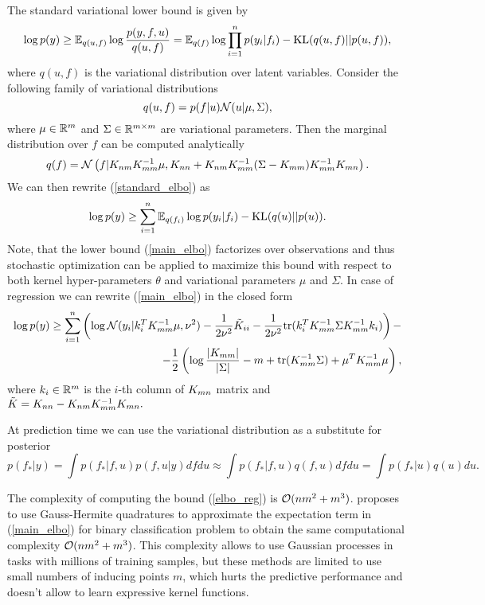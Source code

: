   The standard variational lower bound is given by
  \begin{equation}
  \label{standard_elbo}
    \log p(y) \ge \mathbb{E}_{q(u, f)} \log \frac {p(y, f, u)} {q(u, f)} =
    \mathbb{E}_{q(f)} \log \prod_{i=1}^n p(y_i | f_i) - \mbox{KL}(q(u, f) || p(u, f)),
  \end{equation}
  where $q(u, f)$ is the variational distribution over latent variables.
  Consider the following family of variational distributions
  \begin{equation}
  \label{var_family}
    q(u, f) = p(f | u) \mathcal{N}(u | \mu, \Sigma),
  \end{equation}
  where $\mu \in \mathbb{R}^m$ and $\Sigma \in \mathbb{R}^{m \times m}$ are variational
  parameters. Then the marginal distribution over $f$ can be computed analytically
  \[
    q(f) = \mathcal{N}\left(f | K_{nm} K_{mm}^{-1} \mu, K_{nn} + K_{nm} K_{mm}^{-1} (\Sigma - K_{mm}) K_{mm}^{-1} K_{mn}\right).
  \]
  We can then rewrite (\ref{standard_elbo}) as
\begin{equation}
\label{main_elbo}
  \log p(y) \ge \sum_{i=1}^n \mathbb{E}_{q(f_i)} \log p(y_i | f_i) - \mbox{KL}(q(u) || p(u)).
\end{equation}
  Note, that the lower bound (\ref{main_elbo}) factorizes over observations and
  thus stochastic optimization can be applied to maximize this bound with respect
  to both kernel hyper-parameters $\theta$ and variational parameters $\mu$ and
  $\Sigma$. In case of regression we can rewrite (\ref{main_elbo}) in the closed
  form
  \begin{equation}
    \label{elbo_reg}
    \begin{split}
      \log p(y) \ge
      \sum_{i=1}^n \left ( \log \mathcal{N} (y_i | k_{i}^T K_{mm}^{-1} \mu, \nu^2) -
        \frac 1 {2\nu^2} \tilde K_{ii} -
        \frac 1 {2\nu^2} \mbox{tr} (k_{i}^T K_{mm}^{-1} \Sigma K_{mm}^{-1} k_{i})
      \right )-
      \\
      - \frac 1 2 \left(
        \log \frac {|K_{mm}|} {|\Sigma|} - m + \mbox{tr}(K_{mm}^{-1} \Sigma) +
        \mu^T K_{mm}^{-1} \mu
      \right),
    \end{split}
  \end{equation}
  where $k_{i} \in \mathbb{R}^m$ is the $i$-th column of $K_{mn}$ matrix and $\tilde{K} = K_{nn} - K_{nm} K_{mm}^{-1} K_{mn}.$
  
  At prediction time we can use the variational distribution as a substitute for
  posterior
  \[
    p(f_* | y) = \int p(f_*| f, u) p(f, u |y) d f d u \approx
    \int p(f_* | f, u) q(f, u) d f d u = \int p(f_* | u) q(u) du.
  \]

  The complexity of computing the bound (\ref{elbo_reg}) is $\mathcal{O}(n m^2 + m^3)$.
  \citet{hensman2015} proposes to use Gauss-Hermite quadratures to approximate the
  expectation term in (\ref{main_elbo}) for binary classification problem to
  obtain the same computational complexity $\mathcal{O}(nm^2 + m^3)$. This complexity
  allows to use Gaussian processes in tasks with millions of training samples,
  but these methods are limited to use small numbers of inducing points $m$,
  which hurts the predictive performance and doesn't allow to learn expressive
  kernel functions.

